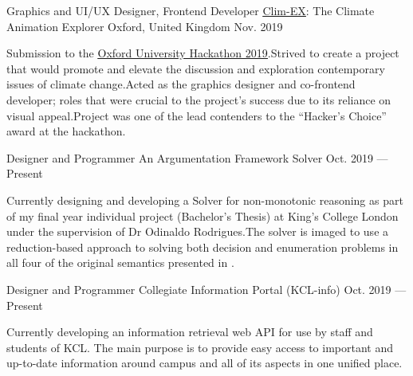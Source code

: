 

\begin{cventries}

\cventry
{Graphics and UI/UX Designer, Frontend Developer} %
{\href{https://github.com/davzzar/clim-AX}{\uline{Clim-EX}}: The Climate Animation Explorer} %
{Oxford, United Kingdom} %
{Nov. 2019} %
{
    \begin{cvitems}
    \bsep Submission to the \href{http://www.ox.ac.uk/students/news/2019-10-14-oxford-hack-2019}{\uline{Oxford University Hackathon 2019}}.\bsep Strived to create a project that would promote and elevate the discussion and exploration contemporary issues of climate change.\bsep Acted as the graphics designer and co-frontend developer; roles that were crucial to the project's success due to its reliance on visual appeal.\bsep Project was one of the lead contenders to the ``Hacker's Choice'' award at the hackathon.
    \end{cvitems}
}

    \cventry
    {Designer and Programmer} %
    {An Argumentation Framework Solver} %
    {} %
    {Oct. 2019 --- Present} %
    {
        \begin{cvitems}
            \bsep Currently designing and developing a \href{https://www.sciencedirect.com/science/article/pii/000437029400041X}{} Solver for non-monotonic reasoning as part of my final year individual project (Bachelor's Thesis) at King's College London under the supervision of Dr Odinaldo Rodrigues.\bsep The solver is imaged to use a reduction-based approach to solving both decision and enumeration problems in all four of the original semantics presented in \href{https://www.sciencedirect.com/science/article/pii/000437029400041X}{}.
        \end{cvitems}
    }

    \cventry
    {Designer and Programmer} %
    {Collegiate Information Portal (KCL-info)} %
    {} %
    {Oct. 2019 --- Present} %
    {
        \begin{cvitems}
            \bsep Currently developing an information retrieval web API for use by staff and students of KCL. The main purpose is to provide easy access to important and up-to-date information around campus and all of its aspects in one unified place.
        \end{cvitems}
    }


\end{cventries}
